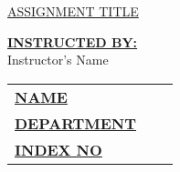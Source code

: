 \documentclass[12pt,a4paper]{article}
\begin{document}
\begin{titlepage}
	
	\begin{flushright}
		\textbf{\uppercase{\fontsize{12}{18} \selectfont {Assignment No: 01}}}
	\end{flushright}
	
	\vspace*{\fill}
	\begin{center}
		\uppercase{\fontsize{30}{45}\selectfont \ul{Assignment Title}}
	\end{center}
	\vfill %
	\begin{multicols}{2}
		\noindent\textbf{\underline{INSTRUCTED BY:}} \\Instructor's Name
		\columnbreak	
		\begin{tabular}{lll}
			\vspace{6pt}
			
			\textbf{\uppercase{\underline{Name}}}       &
			\textbf{\uppercase{\fontsize{12}{18} \selectfont {:}}} 
			{\fontsize{12}{18} \selectfont {<Name>}}      \\
			
			\vspace{6pt}
			\textbf{\uppercase{\underline{Department}}} &
			\textbf{\uppercase{\fontsize{12}{18} \selectfont {:}}} 
			{\fontsize{12}{18} \selectfont {<Department>}}\\
			
			\vspace{6pt}
			\textbf{\uppercase{\underline{Index No}}}   &
			\textbf{\uppercase{\fontsize{12}{18} \selectfont {:}}} 
			{\fontsize{12}{18} \selectfont {<Index No>}}  \\

			
			
		\end{tabular}
	\end{multicols}
	
\end{titlepage}


\tableofcontents
\newpage
{}
\setcounter{page}{1}
\end{document}

